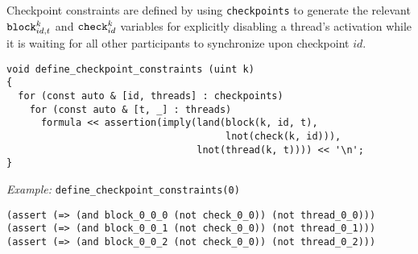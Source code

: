 

\noindent
Checkpoint constraints are defined by using \texttt{checkpoints} to generate the relevant $\texttt{block}^k_{id, t}$ and $\texttt{check}^k_{id}$ variables for explicitly disabling a thread's activation while it is waiting for all other participants to synchronize upon checkpoint $id$.

\begin{lstlisting}[style=c++]
void define_checkpoint_constraints (uint k)
{
  for (const auto & [id, threads] : checkpoints)
    for (const auto & [t, _] : threads)
      formula << assertion(imply(land(block(k, id, t),
                                      lnot(check(k, id))),
                                 lnot(thread(k, t)))) << '\n';
}
\end{lstlisting}


\newpage
\noindent
\emph{Example:} \lstinline[style=c++]{define_checkpoint_constraints(0)}

\begin{lstlisting}[language=smtlib]
(assert (=> (and block_0_0_0 (not check_0_0)) (not thread_0_0)))
(assert (=> (and block_0_0_1 (not check_0_0)) (not thread_0_1)))
(assert (=> (and block_0_0_2 (not check_0_0)) (not thread_0_2)))
\end{lstlisting}

